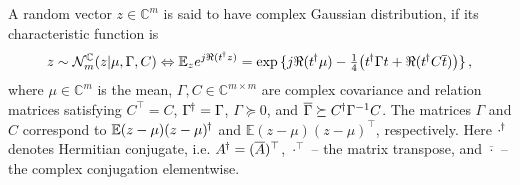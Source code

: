 \documentclass[a4paper,10pt]{article}
\newcommand{\cplx}{\mathbb{C}}
\newcommand{\hop}{{\mkern-1.5mu\dagger}}
\newcommand{\conj}[1]{\overline{#1}}
\begin{document}
A random vector $z\in \cplx^m$ is said to have complex Gaussian distribution, if its characteristic
function is
$$
z \sim \mathcal{N}^{\cplx}_m(z \vert \mu, \Gamma, C)
  \Leftrightarrow
  \mathbb{E}_{z} e^{j \Re{(t^{\hop} z)}}
  = \exp{\{
    j \Re{(t^{\hop} \mu)}
    - \tfrac14 \bigl(
      t^{\hop} \Gamma t + \Re{(t^{\hop} C \conj{t})}
    \bigr)
  \}}
  \,, $$
where $\mu \in \cplx^m$ is the mean, $\Gamma, C \in \cplx^{m\times m}$ are complex covariance
and relation matrices satisfying $C^\top = C$, $\Gamma^{\hop} = \Gamma$, $\Gamma \succeq 0$,
and $
  \conj{\Gamma} \succeq C^{\hop} \Gamma^{-1} C
$. The matrices $\Gamma$ and $C$ correspond to $
  \mathbb{E} (z - \mu)(z - \mu)^{\hop}
$ and $
  \mathbb{E} (z - \mu)(z - \mu)^\top
$, respectively. Here ${\cdot}^{\hop}$ denotes Hermitian conjugate, i.e. $
  A^{\hop} = (\conj{A})^\top
$, ${\cdot}^{\top}$ -- the matrix transpose, and $\conj{\cdot}$ -- the complex conjugation
elementwise.
%
\end{document}

